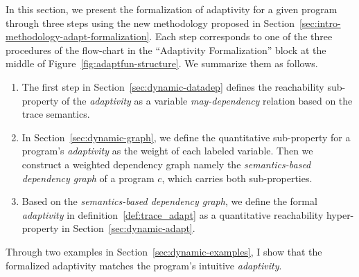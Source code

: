
In this section, we present the formalization of adaptivity for a given program through three steps using the new methodology proposed in Section~\ref{sec:intro-methodology-adapt-formalization}.
Each step corresponds to one of the three procedures of the flow-chart in the ``Adaptivity Formalization'' block at the middle of Figure~\ref{fig:adaptfun-structure}. We
summarize them as follows.
 \begin{enumerate}
 \item The first step in 
 Section~\ref{sec:dynamic-datadep} defines the reachability sub-property of 
 the \emph{adaptivity} as a
 variable \emph{may-dependency} relation based on the trace semantics.
 \item In Section~\ref{sec:dynamic-graph}, 
 we define the quantitative sub-property for a program's \emph{adaptivity} as the weight of each labeled variable.
 Then we construct a weighted dependency graph namely
the \emph{semantics-based dependency graph} of a program $c$, which carries both 
sub-properties. 

\item 
 Based on the \emph{semantics-based dependency graph},
 we define the formal \emph{adaptivity} in definition~\ref{def:trace_adapt} as a quantitative reachability hyper-property in Section~\ref{sec:dynamic-adapt}.
\end{enumerate}
Through two examples in Section~\ref{sec:dynamic-examples}, I show that the formalized
adaptivity matches the program's intuitive \emph{adaptivity}.

